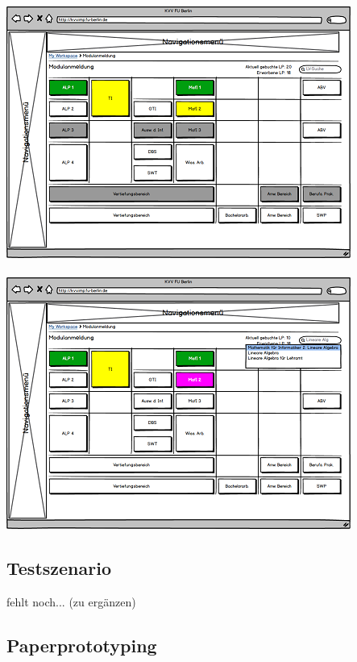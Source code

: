 \documentclass{article}
\begin{document}
\\
\includegraphics{ucd_ppt_mod_selected.png}\\
\\
\includegraphics{ucd_ppt_lv_search.png}

\subsection{Testszenario}

fehlt noch... (zu ergänzen)

\subsection{Paperprototyping}
\end{document}
